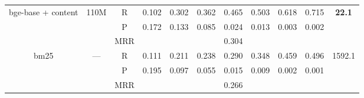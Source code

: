 {\begin{tabular}{ccccccccccc}
    \midrule
    \multirow{3}{*}{bge-base + content}                   & \multirow{3}{*}{110M} & R   & 0.102 & 0.302 & 0.362 & 0.465 & 0.503 & 0.618 & 0.715 & \multirow{3}{*}{\textbf{22.1}} \\
                                          &                            & P   & 0.172 & 0.133 & 0.085 & 0.024 & 0.013 & 0.003 & 0.002 & \\
                                          &                            & MRR & \multicolumn{7}{c}{0.304} & \\
    \midrule
    \multirow{3}{*}{bm25}                                 & \multirow{3}{*}{---} & R   & 0.111 & 0.211 & 0.238 & 0.290 & 0.348 & 0.459 & 0.496 & \multirow{3}{*}{1592.1} \\
                                          &                           & P   & 0.195 & 0.097 & 0.055 & 0.015 & 0.009 & 0.002 & 0.001 & \\
                                          &                           & MRR & \multicolumn{7}{c}{0.266} & \\
  \bottomrule
\end{tabular}%
}
